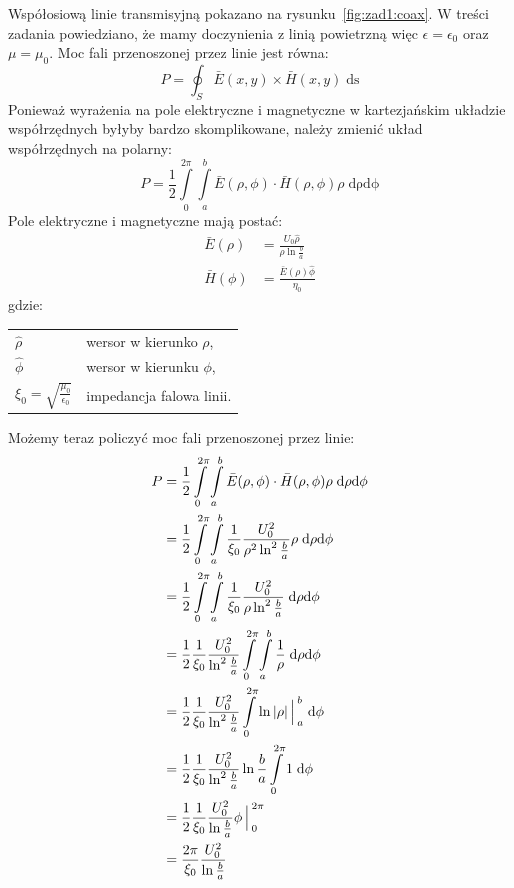 \documentclass[rep.tex]{subfiles}
\begin{document}
Współosiową linie transmisyjną pokazano na rysunku~\ref{fig:zad1:coax}.
W treści zadania powiedziano, że mamy doczynienia z linią powietrzną więc $\epsilon = \epsilon_0$ oraz $\mu = \mu_0$.
Moc fali przenoszonej przez linie jest równa:
\begin{equation}
  P = \oint_S\bar{E}(x, y) \times \bar{H}(x, y) \; \mathrm{ds}
\end{equation}
Ponieważ wyrażenia na pole elektryczne i magnetyczne w kartezjańskim układzie współrzędnych byłyby bardzo skomplikowane,
należy zmienić układ współrzędnych na polarny:
\begin{equation}
  P = \frac{1}{2} \int\limits_0^{2\pi}\int\limits_a^b \bar{E}(\rho, \phi) \cdot \bar{H}(\rho, \phi) \rho \; \mathrm{d\rho} \mathrm{d\phi}
\end{equation}
Pole elektryczne i magnetyczne mają postać:
\begin{align}
  \bar{E}(\rho)    & = \frac{U_0\hat{\rho}}{\rho \ln \frac{b}{a}} \\
  \bar{H}(\phi) & = \frac{\bar{E}(\rho)\hat{\phi}}{\eta_0}
\end{align}
gdzie: \\
\begin{tabular}{l @{ - } l}
  $\hat{\rho}$    & wersor w kierunko $\rho$, \\
  $\hat{\phi}$ & wersor w kierunku $\phi$, \\
  $\xi_0 = \sqrt{\frac{\mu_0}{\epsilon_0}}$ & impedancja falowa linii. \\
\end{tabular}

Możemy teraz policzyć moc fali przenoszonej przez linie:
\begin{align}
  P & =  \frac{1}{2} \int\limits_0^{2\pi}\int\limits_a^b \bar{E}(\rho, \phi) \cdot \bar{H}(\rho, \phi) \rho \; \mathrm{d\rho} \mathrm{d\phi} \nonumber \\
    & =  \frac{1}{2} \int\limits_0^{2\pi}\int\limits_a^b \frac{1}{\xi_0}\frac{U_0^2}{\rho^2\ln^2\frac{b}{a}} \rho \; \mathrm{d\rho} \mathrm{d\phi} \nonumber \\
    & =  \frac{1}{2} \int\limits_0^{2\pi}\int\limits_a^b \frac{1}{\xi_0}\frac{U_0^2}{\rho\ln^2\frac{b}{a}} \; \mathrm{d\rho} \mathrm{d\phi} \nonumber \\
    & =  \frac{1}{2} \frac{1}{\xi_0}\frac{U_0^2}{\ln^2\frac{b}{a}} \int\limits_0^{2\pi}\int\limits_a^b \frac{1}{\rho} \; \mathrm{d\rho} \mathrm{d\phi} \nonumber \\
    & =  \frac{1}{2} \frac{1}{\xi_0}\frac{U_0^2}{\ln^2\frac{b}{a}} \int\limits_0^{2\pi} \ln|\rho|\Big\arrowvert_a^b \; \mathrm{d\phi} \nonumber \\
    & =  \frac{1}{2} \frac{1}{\xi_0}\frac{U_0^2}{\ln^2\frac{b}{a}} \ln\frac{b}{a} \int\limits_0^{2\pi} 1 \; \mathrm{d\phi} \nonumber \\
    & =  \frac{1}{2} \frac{1}{\xi_0}\frac{U_0^2}{\ln\frac{b}{a}} \phi\Big\arrowvert_0^{2\pi} \nonumber \\
    & =  \frac{2\pi}{\xi_0}\frac{U_0^2}{\ln\frac{b}{a}} \label{eqn:zad1:power}
\end{align}
\end{document}
